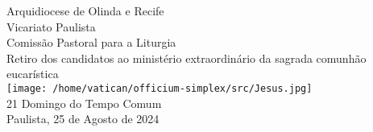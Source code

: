 \begin{center}
    \LARGE Arquidiocese de Olinda e Recife
    \vspace{.1cm} \\
    \LARGE Vicariato Paulista
    \vspace{.1cm} \\
    \LARGE Comissão Pastoral para a Liturgia
    \vspace{.2cm} \\
    \textcolor{VioletRed2}{\Large Retiro dos candidatos ao ministério extraordinário da sagrada comunhão eucarística}
    \vspace{.4cm} \\
    \texttt{[image: /home/vatican/officium-simplex/src/Jesus.jpg]}
    \vspace{.4cm} \\
    \textcolor{VioletRed2}{\Large 21\textordmasculine{} Domingo do Tempo Comum}
    \vspace{\fill}\\
    \Large Paulista, 25 de Agosto de 2024
\end{center}
